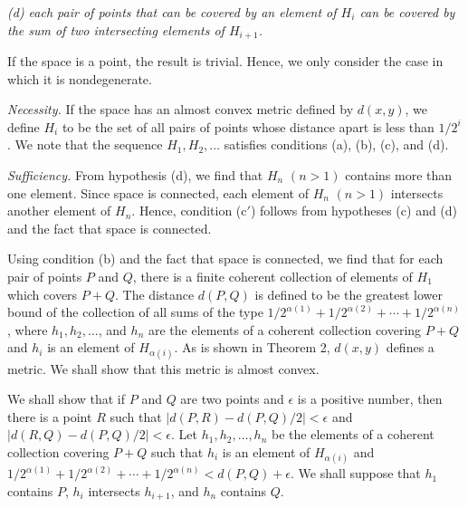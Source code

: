 \documentclass[11pt,a4paper,leqno,twoside]{article}
\begin{document}
\textit{(d) each pair of points that can be covered by an element of $H_i$ can be covered by the sum of two intersecting elements of $H_{i+1}$.}

If the space is a point, the result is trivial. Hence, we only consider the case in which it is nondegenerate.

\textit{Necessity.} If the space has an almost convex metric defined by $d(x,y)$, we define $H_i$ to be the set of all pairs of points whose distance apart is less than $1/2^i$. We note that the sequence $H_1,H_2,\ldots$ satisfies conditions (a), (b), (c), and (d).

\textit{Sufficiency.} From hypothesis (d), we find that $H_n$ $(n>1)$ contains more
\newpage
\noindent than one element. Since space is connected, each element of $H_n$ $(n>1)$ intersects another element of $H_n$. Hence, condition (c$'$) follows from hypotheses (c) and (d) and the fact that space is connected.

Using condition (b) and the fact that space is connected, we find that for each pair of points $P$ and $Q$, there is a finite coherent collection of elements of $H_1$ which covers $P+Q$. The distance $d(P,Q)$ is defined to be the greatest lower bound of the collection of all sums of the type $1/2^{\alpha(1)}+1/2^{\alpha(2)}+\cdots+1/2^{\alpha(n)}$, where $h_1,h_2,\ldots$, and $h_n$ are the elements of a coherent collection covering $P+Q$ and $h_i$ is an element of $H_{\alpha(i)}$. As is shown in Theorem 2, $d(x,y)$ defines a metric. We shall show that this metric is almost convex.

We shall show that if $P$ and $Q$ are two points and $\epsilon$ is a positive number, then there is a point $R$ such that $|d(P,R)-d(P,Q)/2|<\epsilon$ and $|d(R,Q)-d(P,Q)/2|<\epsilon$. Let $h_1,h_2,\ldots,h_n$ be the elements of a coherent collection covering $P+Q$ such that $h_i$ is an element of $H_{\alpha(i)}$ and $1/2^{\alpha(1)}+1/2^{\alpha(2)}+\cdots+1/2^{\alpha(n)}<d(P,Q)+\epsilon$. We shall suppose that $h_1$ contains $P$, $h_i$ intersects $h_{i+1}$, and $h_n$ contains $Q$.
\end{document}
